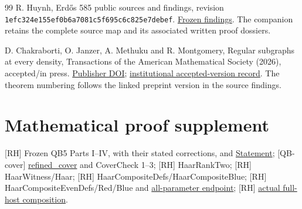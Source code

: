 \documentclass[smallextended]{svjour3}
\begin{document}
\begin{thebibliography}{99}
R. Huynh, Erdős 585 public sources and findings, revision
{\ttfamily\nolinkurl{1efc324e155ef0b6a7081c5f695c6c825e7debef}}.
\href{https://github.com/roberthuynh/erdos-585/blob/1efc324e155ef0b6a7081c5f695c6c825e7debef/findings/FINDINGS.md}{Frozen
findings}. The companion retains the complete source map and its
associated written proof dossiers.

D. Chakraborti, O. Janzer, A. Methuku and R. Montgomery,
Regular subgraphs at every density, Transactions of the American
Mathematical Society (2026), accepted/in press.
\href{https://doi.org/10.1090/tran/9694}{Publisher DOI};
\href{https://wrap.warwick.ac.uk/id/eprint/194663/}{institutional
accepted-version record}. The theorem numbering follows the linked
preprint version in the source findings.
\end{thebibliography}

\section*{Mathematical proof supplement}
{[}RH{]} Frozen QB5 Parts I--IV, with their stated corrections, and
\href{https://github.com/roberthuynh/erdos-585/blob/1efc324e155ef0b6a7081c5f695c6c825e7debef/Openmath/Proofs/QB5/Statement.lean\#L42}{Statement};
{[}QB-cover{]}
\href{https://github.com/roberthuynh/erdos-585/blob/1efc324e155ef0b6a7081c5f695c6c825e7debef/Openmath/Proofs/QB5/Cover.lean\#L800}{refined\_cover}
and CoverCheck 1--3; {[}RH{]} HaarRankTwo; {[}RH{]} HaarWitness/Haar;
{[}RH{]} HaarCompositeDefs/HaarCompositeBlue; {[}RH{]}
HaarCompositeEvenDefs/Red/Blue and
\href{https://github.com/roberthuynh/erdos-585/blob/1efc324e155ef0b6a7081c5f695c6c825e7debef/findings/supplement/lean/Openmath/Proofs/HaarCompositeEven.lean\#L441}{all-parameter
endpoint}; {[}RH{]}
\href{https://github.com/alejandrozu/openmath-2026-judging/blob/70c5ec3107658182f22c207d4c50f53f9cb3e602/robert-review-2026-10-07/lean/CycleComposition.lean\#L171}{actual
full-host composition}.
\end{document}
